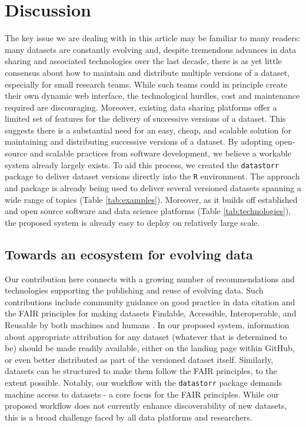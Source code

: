 \documentclass[a4paper,num-refs]{assets/oup-contemporary}
\begin{document}
\section{Discussion}

The key issue we are dealing with in this article may be familiar to many readers: many datasets are constantly evolving and, despite tremendous advances in data sharing and associated technologies over the last decade, there is as yet little consensus about how to maintain and distribute multiple versions of a dataset, especially for small research teams. While such teams could in principle create their own dynamic web interface, the technological hurdles, cost and maintenance required are discouraging. Moreover, existing data sharing platforms offer a limited set of features for the delivery of successive versions of a dataset. This suggests there is a substantial need for an easy, cheap, and scalable solution for maintaining and distributing successive versions of a dataset. By adopting open-source and scalable practices from software development, we believe a workable system already largely exists. To aid this process, we created the \texttt{datastorr} package to deliver dataset versions directly into the \texttt{R} environment. The approach and package is already being used to deliver several versioned datasets spanning a wide range of topics (Table \ref{tab:examples}). Moreover, as it builds off established and open source software and data science platforms (Table \ref{tab:technologies}), the proposed system is already easy to deploy on relatively large scale.

\subsection{Towards an ecosystem for evolving data}

Our contribution here connects with a growing number of recommendations and technologies supporting the publishing and reuse of evolving data. Such contributions include community guidance on good practice in data citation \cite{Force11-2014} and the FAIR principles for making datasets Findable, Accessible, Interoperable, and Reusable by both machines and humans \cite{Wilkinson-2016}. In our proposed system, information about appropriate attribution for any dataset  (whatever that is determined to be) should be made readily available, either on the landing page within GitHub, or even better distributed as part of the versioned dataset itself. Similarly, datasets can be structured to make them follow the FAIR principles, to the extent possible. Notably, our workflow with the \texttt{datastorr} package demands machine access to datasets - a core focus for the FAIR principles. While our proposed workflow does not currently enhance discoverability of new datasets, this is a broad challenge faced by all data platforms and researchers.
\end{document}
